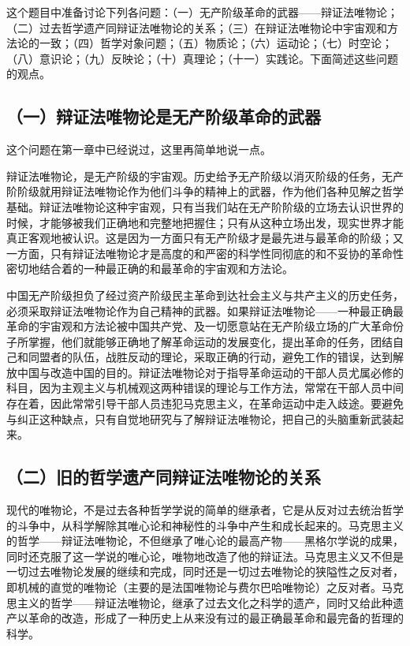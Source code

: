 这个题目中准备讨论下列各问题：（一）无产阶级革命的武器——辩证法唯物论；（二）过去哲学遗产同辩证法唯物论的关系；（三）在辩证法唯物论中宇宙观和方法论的一致；（四）哲学对象问题；（五）物质论；（六）运动论；（七）时空论；（八）意识论；（九）反映论；（十）真理论；（十一）实践论。下面简述这些问题的观点。

\subsection{（一）辩证法唯物论是无产阶级革命的武器}

这个问题在第一章中已经说过，这里再简单地说一点。

辩证法唯物论，是无产阶级的宇宙观。历史给予无产阶级以消灭阶级的任务，无产阶阶级就用辩证法唯物论作为他们斗争的精神上的武器，作为他们各种见解之哲学基础。辩证法唯物论这种宇宙观，只有当我们站在无产阶阶级的立场去认识世界的时候，才能够被我们正确地和完整地把握住；只有从这种立场出发，现实世界才能真正客观地被认识。这是因为一方面只有无产阶级才是最先进与最革命的阶级；又一方面，只有辩证法唯物论才是高度的和严密的科学性同彻底的和不妥协的革命性密切地结合着的一种最正确的和最革命的宇宙观和方法论。

中国无产阶级担负了经过资产阶级民主革命到达社会主义与共产主义的历史任务，必须采取辩证法唯物论作为自己精神的武器。如果辩证法唯物论——一种最正确最革命的宇宙观和方法论被中国共产党、及一切愿意站在无产阶级立场的广大革命份子所掌握，他们就能够正确地了解革命运动的发展变化，提出革命的任务，团结自己和同盟者的队伍，战胜反动的理论，采取正确的行动，避免工作的错误，达到解放中国与改造中国的目的。辩证法唯物论对于指导革命运动的干部人员尤属必修的科目，因为主观主义与机械观这两种错误的理论与工作方法，常常在干部人员中间存在着，因此常常引导干部人员违犯马克思主义，在革命运动中走入歧途。要避免与纠正这种缺点，只有自觉地研究与了解辩证法唯物论，把自己的头脑重新武装起来。

\subsection{（二）旧的哲学遗产同辩证法唯物论的关系}

现代的唯物论，不是过去各种哲学学说的简单的继承者，它是从反对过去统治哲学的斗争中，从科学解除其唯心论和神秘性的斗争中产生和成长起来的。马克思主义的哲学——辩证法唯物论，不但继承了唯心论的最高产物——黑格尔学说的成果，同时还克服了这一学说的唯心论，唯物地改造了他的辩证法。马克思主义又不但是一切过去唯物论发展的继续和完成，同时还是一切过去唯物论的狭隘性之反对者，即机械的直觉的唯物论（主要的是法国唯物论与费尔巴哈唯物论）之反对者。马克思主义的哲学——辩证法唯物论，继承了过去文化之科学的遗产，同时又给此种遗产以革命的改造，形成了一种历史上从来没有过的最正确最革命和最完备的哲理的科学。

